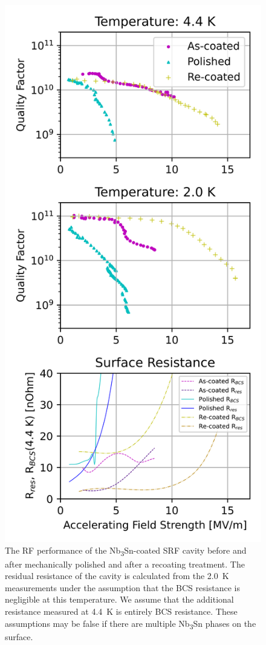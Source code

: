 \documentclass[reprint,amsmath,amssymb,aps]{revtex4-2}%
\begin{document}
\begin{figure}[htb]%
\centering%
\includegraphics[width=0.8\columnwidth]{../doc/figs/VTS_Test_Graph.png}%
\caption{The RF performance of the Nb\textsubscript{3}Sn-coated SRF cavity before and after mechanically polished and after a recoating treatment. The residual resistance of the cavity is calculated from the 2.0~K measurements under the assumption that the BCS resistance is negligible at this temperature. We assume that the additional resistance measured at 4.4~K is entirely BCS resistance. These assumptions may be false if there are multiple Nb\textsubscript{3}Sn phases on the surface.}%
\label{fig:vtstestgraph}%
\end{figure}
\end{document}
